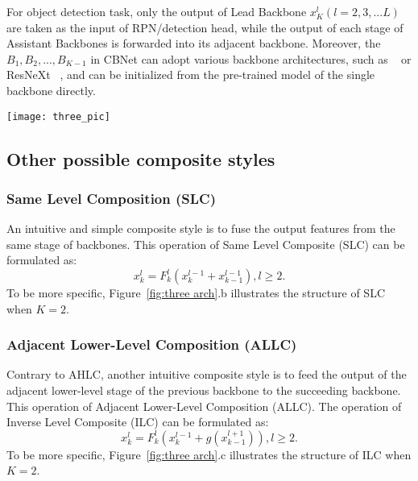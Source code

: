 \documentclass[letterpaper]{article} \usepackage{aaai20}  \usepackage{multirow}
\begin{document}
For object detection task, only the output of Lead Backbone $x_K^{l}(l = 2,3,...L)$ are taken as the input of RPN/detection head, while the output of each stage of Assistant Backbones is forwarded into its adjacent backbone. Moreover, the $B_{1}, B_{2}, ... , B_{K-1}$ in CBNet can adopt various backbone architectures, such as ~\cite{he2016deep} or ResNeXt ~\cite{xie2017aggregated}, and can be initialized from the pre-trained model of the single backbone directly.







\begin{figure*}[t]
	\centering
	\texttt{[image: three\_pic]}
	\caption{Four kinds of composite styles for Dual-Backbone architecture (an Assistant Backbone and a Lead Backbone). (a) Adjacent Higher-Level Composition (AHLC). (b) Same Level Composition (SLC). (c) Adjacent Lower-Level Composition (ALLC). (d) Dense Higher-Level Composition (DHLC). The composite connection denotes in blue boxes represents some simple operations, \textit{i.e.}, element-wise operation, scaling, 1$\times$1 Conv layer and bn layer.
	}
	\label{fig:three arch}
\end{figure*}

\subsection{Other possible composite styles}
\label{sec:opcab}

\subsubsection{Same Level Composition (SLC)} 
An intuitive and simple composite style is to fuse the output features from the same stage of backbones. This operation of Same Level Composite (SLC) can be formulated as:
\begin{equation}
x_k^l = F_k^l(x_k^{l-1} + x_{k-1}^{l-1}),  l\ge2.
\end{equation}
To be more specific, Figure~\ref{fig:three arch}.b illustrates the structure of SLC when $K=2$.

\subsubsection{Adjacent Lower-Level Composition (ALLC)} 
Contrary to AHLC, another intuitive composite style is to feed the output of the adjacent lower-level stage of the previous backbone to the succeeding backbone. This operation of Adjacent Lower-Level Composition (ALLC). The operation of Inverse Level Composite (ILC) can be formulated as:
\begin{equation}
x_k^l = F_k^l(x_k^{l-1} + g(x_{k-1}^{l+1})),  l\ge2.
\end{equation}
To be more specific, Figure~\ref{fig:three arch}.c illustrates the structure of ILC when $K=2$.
\end{document}

